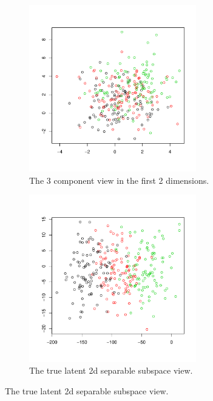 \documentclass[12pt]{article}
\begin{document}
\begin{figure}[H]
  \begin{subfigure}[b]{0.49\textwidth}
 \includegraphics[width=0.8\textwidth]{pics/originalY2d.pdf}
  \caption{The 3 component view in the first 2 dimensions.}
\end{subfigure}
  \hfill
   \begin{subfigure}[b]{0.49\textwidth}
 \includegraphics[width=0.8\textwidth]{pics/ld_arc_truth.pdf}
  \caption{The true latent 2d separable subspace view.}
\end{subfigure}


\end{figure}
\end{document}
